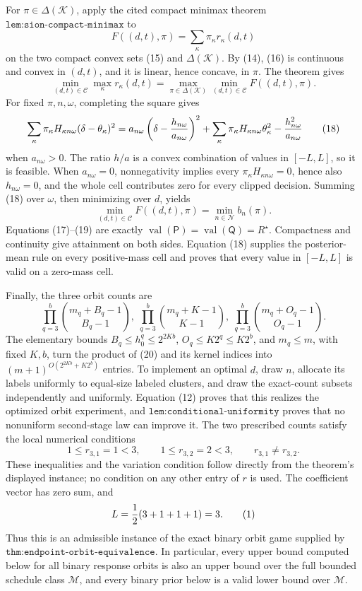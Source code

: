For \(\pi\in\Delta(\mathcal K)\), apply the cited compact minimax theorem \(\texttt{lem:sion-compact-minimax}\) to
\[
 F((d,t),\pi)=\sum_\kappa\pi_\kappa r_\kappa(d,t)                         \tag{16}
\]
on the two compact convex sets (15) and \(\Delta(\mathcal K)\).  By (14), (16) is continuous and convex in \((d,t)\), and it is linear, hence concave, in \(\pi\).  The theorem gives
\[
 \min_{(d,t)\in\mathcal C}\max_\kappa r_\kappa(d,t)
 =\max_{\pi\in\Delta(\mathcal K)}\min_{(d,t)\in\mathcal C}F((d,t),\pi). \tag{17}
\]
For fixed \(\pi,n,\omega\), completing the square gives
\[
 \sum_\kappa\pi_\kappa H_{\kappa n\omega}
       (\delta-\theta_\kappa)^2
 =a_{n\omega}\left(\delta-{h_{n\omega}\over a_{n\omega}}\right)^2
  +\sum_\kappa\pi_\kappa H_{\kappa n\omega}\theta_\kappa^2
  -{h_{n\omega}^2\over a_{n\omega}}                                      \tag{18}
\]
when \(a_{n\omega}>0\).  The ratio \(h/a\) is a convex combination of values in \([-L,L]\), so it is feasible.  When \(a_{n\omega}=0\), nonnegativity implies every \(\pi_\kappa H_{\kappa n\omega}=0\), hence also \(h_{n\omega}=0\), and the whole cell contributes zero for every clipped decision.  Summing (18) over \(\omega\), then minimizing over \(d\), yields
\[
 \min_{(d,t)\in\mathcal C}F((d,t),\pi)=\min_{n\in\mathcal N}b_n(\pi).     \tag{19}
\]
Equations (17)--(19) are exactly \(\operatorname{val}(\mathsf P)=\operatorname{val}(\mathsf Q)=R^\star\).  Compactness and continuity give attainment on both sides.  Equation (18) supplies the posterior-mean rule on every positive-mass cell and proves that every value in \([-L,L]\) is valid on a zero-mass cell.

Finally, the three orbit counts are
\[
 \prod_{q=3}^b\binom{m_q+B_q-1}{B_q-1},\;
 \prod_{q=3}^b\binom{m_q+K-1}{K-1},\;
 \prod_{q=3}^b\binom{m_q+O_q-1}{O_q-1}.                                   \tag{20}
\]
The elementary bounds \(B_q\le h_0^q\le2^{2Kb}\), \(O_q\le K2^q\le K2^b\), and \(m_q\le m\), with fixed \(K,b\), turn the product of (20) and its kernel indices into
\(
 (m+1)^{O(2^{2Kb}+K2^b)}
\)
entries.  To implement an optimal \(d\), draw \(n\), allocate its labels uniformly to equal-size labeled clusters, and draw the exact-count subsets independently and uniformly.  Equation (12) proves that this realizes the optimized orbit experiment, and \(\texttt{lem:conditional-uniformity}\) proves that no nonuniform second-stage law can improve it.
The two prescribed counts satisfy the local numerical conditions
\[
1\le r_{3,1}=1<3,
\qquad
1\le r_{3,2}=2<3,
\qquad
r_{3,1}\ne r_{3,2}.
\]
These inequalities and the variation condition follow directly from the theorem's displayed instance; no condition on any other entry of \(r\) is used.  The coefficient vector has zero sum, and
\[
L={1\over2}(3+1+1+1)=3.                                                    \tag{1}
\]
Thus this is an admissible instance of the exact binary orbit game supplied by \(\texttt{thm:endpoint-orbit-equivalence}\).  In particular, every upper bound computed below for all binary response orbits is also an upper bound over the full bounded schedule class \(\mathcal M\), and every binary prior below is a valid lower bound over \(\mathcal M\).

